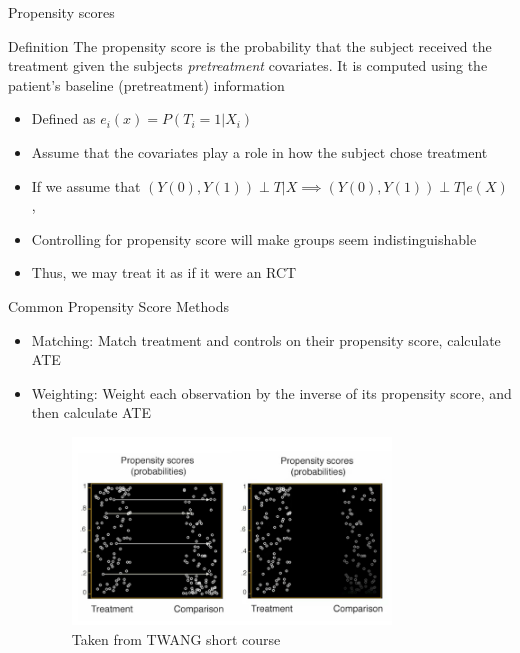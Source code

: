 \begin{frame}{Propensity scores}
\begin{block}{Definition}
The propensity score is the probability that the subject received the treatment given the subjects \textit{pretreatment}
covariates. It is computed using the patient's baseline (pretreatment) information \cite{Rosenbaum1983}
\end{block}
 \begin{itemize}
  \item Defined as  $e_i(x)=P(T_i =1 |X_i)$
  \item Assume that the covariates play a role in how the subject chose treatment
  \item If we assume that $(Y(0),Y(1))\perp T|X \implies (Y(0),Y(1))\perp T|e(X)$, \cite{Rosenbaum1983}
  \item Controlling for propensity score will make groups seem indistinguishable
  \item Thus, we may treat it as if it were an RCT
 \end{itemize}

\end{frame}

\begin{frame}{Common Propensity Score Methods}
\begin{itemize}
 \item Matching: Match treatment and controls on their propensity score, calculate ATE
 \item Weighting: Weight each observation by the inverse of its propensity score, and then calculate ATE
 
  \begin{figure}[h!]
  \centering
    \includegraphics[width=0.8\textwidth]{ps_examples.png}
    \caption{Taken from TWANG short course \cite{Rand2015}}
\label{fig:psexamp}

\end{figure}
\end{itemize}


\end{frame}

